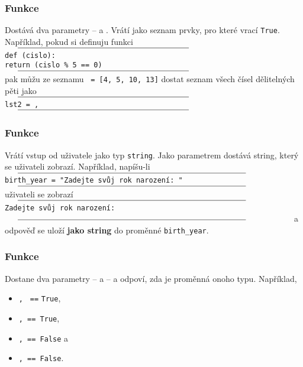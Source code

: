 \begin{frame}
 \frametitle{Funkce \texttt{}}
 \begin{block}{Dostává dva parametry --  a
  . Vrátí
  jako seznam prvky, pro které  vrací \texttt{True}.}
  \pause
  \vspace{1ex}
  Například, pokud si definuju funkci
  $\vcenter{\rule{.6\textwidth}{0.4pt}}$
  \texttt{def (cislo):}\\
  \hspace{4ex}\texttt{return (cislo \% 5 == 0)}
  $\vcenter{\rule{.6\textwidth}{0.4pt}}$
  \pause
  pak můžu ze seznamu \texttt{ = [4, 5, 10, 13]} dostat seznam všech
  čísel dělitelných pěti jako
  $\vcenter{\rule{.6\textwidth}{0.4pt}}$
  \texttt{lst2 = ,~\mlb{)}}
  $\vcenter{\rule{.6\textwidth}{0.4pt}}$
 \end{block}
\end{frame}

\begin{frame}
 \frametitle{Funkce \texttt{}}
 \begin{block}{Vrátí vstup od uživatele jako typ \texttt{string}. Jako
  parametrem dostává string, který se uživateli zobrazí.}
  \pause
  \vspace{1ex}
  Například, napíšu-li
  $\vcenter{\rule{.8\textwidth}{0.4pt}}$
  \texttt{birth\_year = "Zadejte svůj rok narození: "\mlb{)}}\\
  $\vcenter{\rule{.8\textwidth}{0.4pt}}$
  \pause
  uživateli se zobrazí
  $\vcenter{\rule{.8\textwidth}{0.4pt}}$
  \texttt{Zadejte svůj rok narození: }
  $\vcenter{\rule{.8\textwidth}{0.4pt}}$
  a odpověď se uloží \textbf{jako string} do proměnné
  \texttt{birth\_year}.
 \end{block}
\end{frame}

\begin{frame}
 \frametitle{Funkce \texttt{}}
 \begin{block}{Dostane dva parametry --  a  -- a
  odpoví, zda je proměnná onoho typu.}
  \pause
  \vspace{1ex}
  Například,
  \begin{itemize}
   \item \texttt{,~\mlb{)}} \texttt{==} \texttt{True},
   \item \texttt{, \mlb{)} == True},
   \item \texttt{, \mlb{)} == False} a
   \item \texttt{\mlg{[1, 2]}, \mlb{)} == False}.
  \end{itemize}
 \end{block}
\end{frame}

